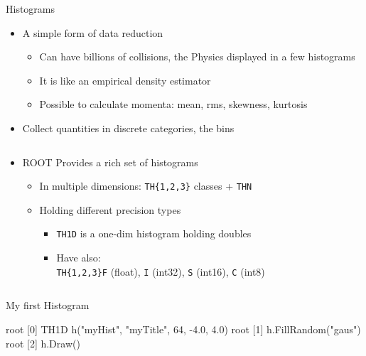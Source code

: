 \documentclass[aspectratio=169]{beamer}
\newcommand{\myfigure}[2]{
    \begin{figure}
        \makebox[\textwidth]{%
            \texttt{[image: \#2]}
        }
    \end{figure}
}
\begin{document}
\begin{frame}[fragile]{Histograms}

\begin{itemize}
    \item{A simple form of data reduction}
    \begin{itemize}
        \item{Can have billions of collisions, the Physics displayed in a few histograms}
        \item{It is like an empirical density estimator}
        \item{Possible to calculate momenta: mean, rms, skewness, kurtosis}
    \end{itemize}
    \item{Collect quantities in discrete categories, the bins}
\end{itemize}

\begin{columns}
    \begin{column}{0.7\textwidth}

\begin{itemize}
    \item{ROOT Provides a rich set of histograms}
    \begin{itemize}
        \item{In multiple dimensions: \texttt{TH\{1,2,3\}} classes + \texttt{THN}}
        \item{Holding different precision types}
        \begin{itemize}
            \item{\texttt{TH1D} is a one-dim histogram holding doubles}
            \item{Have also:\\ \texttt{TH\{1,2,3\}F} (ﬂoat), \texttt{I} (int32), \texttt{S} (int16), \texttt{C} (int8)}
        \end{itemize}
    \end{itemize}
\end{itemize}

\end{column}

    \begin{column}{0.3\textwidth}
        \myfigure{1.00}{CMS-HIG-12-028_Figure_003.pdf}
    \end{column}
\end{columns}

\end{frame}

\begin{frame}[fragile]{My first Histogram}

    \vspace{4mm}

    \begin{myterminal}
root [0] TH1D h("myHist", "myTitle", 64, -4.0, 4.0)
root [1] h.FillRandom("gaus")
root [2] h.Draw()
    \end{myterminal}

    \myfigure{0.5}{figure-001.pdf}

\end{frame}
\end{document}
